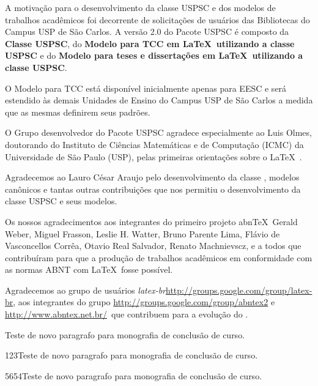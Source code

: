 \begin{agradecimentos}
	A motivação para o desenvolvimento da classe USPSC e dos modelos de trabalhos acadêmicos foi decorrente de solicitações de usuários das Bibliotecas do Campus USP de São Carlos. A versão 2.0 do Pacote USPSC é composto da \textbf{Classe USPSC}, do \textbf{Modelo para TCC em \LaTeX\ utilizando a classe USPSC} e do \textbf{Modelo para teses e dissertações em \LaTeX\ utilizando a classe USPSC}.
	
	O Modelo para TCC está disponível inicialmente apenas para EESC e será estendido às demais Unidades de Ensino do Campus USP de São Carlos a medida que as mesmas definirem seus padrões.
	
	O Grupo desenvolvedor do Pacote USPSC agradece especialmente ao Luis Olmes, doutorando do Instituto de Ciências Matemáticas e de Computação (ICMC) da Universidade de São Paulo (USP), pelas primeiras orientações sobre o \LaTeX\ . 
	
	Agradecemos ao Lauro César Araujo pelo desenvolvimento da classe  \abnTeX, modelos canônicos e tantas outras contribuições que nos permitiu o desenvolvimento da classe USPSC e seus modelos.
	
	Os nossos agradecimentos aos integrantes do primeiro
	projeto abn\TeX\, Gerald Weber, Miguel Frasson, Leslie H. Watter, Bruno Parente Lima, Flávio de Vasconcellos Corrêa, Otavio Real
	Salvador, Renato Machnievscz, e a todos que contribuíram para que a produção de trabalhos acadêmicos em conformidade com
	as normas ABNT com \LaTeX\ fosse possível.
	
	Agradecemos ao grupo de usuários
	\emph{latex-br}{\url{http://groups.google.com/group/latex-br}}, aos integrantes do grupo
	\emph{\abnTeX}{\url{http://groups.google.com/group/abntex2}  e \url{http://www.abntex.net.br/}}~que contribuem para a evolução do \abnTeX.
	
	Teste de novo paragrafo para monografia de conclusão de curso.
	
	123Teste de novo paragrafo para monografia de conclusão de curso.
	
	5654Teste de novo paragrafo para monografia de conclusão de curso.
\end{agradecimentos}

